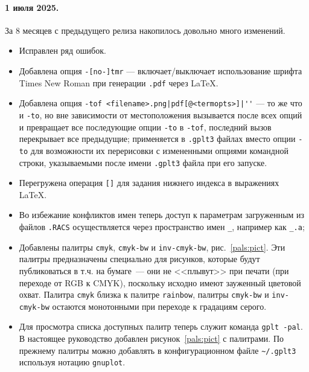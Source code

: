 \documentclass[12pt]{article}
\begin{document}
\paragraph{1 июля 2025.} За 8 месяцев с предыдущего релиза накопилось довольно много изменений.
\begin{itemize}
\item Исправлен ряд ошибок.
\item Добавлена опция \verb'-[no-]tmr' --- включает/выключает использование шрифта Times New Roman при генерации \verb'.pdf' через \LaTeX.
\item Добавлена опция \verb:-tof <filename>.png|pdf[@<termopts>]|'': --- то же что и \verb'-to', но вне зависимости 
  от местоположения вызывается после всех опций и превращает все последующие
   опции \verb'-to' в \verb'-tof', последний вызов перекрывает все предыдущие; применяется в
   \verb'.gplt3' файлах вместо опции \verb'-to' для возможности их перерисовки с измененными опциями командной строки, указываемыми после имени
   \verb'.gplt3' файла при его запуске.
\item Перегружена операция \verb'[]' для задания нижнего индекса в выражениях \LaTeX.
\item Во избежание конфликтов имен теперь доступ к  параметрам загруженным из файлов \verb'.RACS' осуществляется через пространство имен \verb'_',
  например как \verb'_.a';
\item Добавлены палитры \verb'cmyk', \verb'cmyk-bw' и \verb'inv-cmyk-bw', рис.~\ref{pals:pict}.
  Эти палитры предназначены специально для рисунков, которые будут публиковаться в т.ч.
  на бумаге~--- они не <<плывут>> при печати (при переходе от RGB к CMYK),
  поскольку исходно имеют зауженный цветовой охват. Палитра \verb'cmyk'  близка к палитре \verb'rainbow', палитры \verb'cmyk-bw' и \verb'inv-cmyk-bw'
  остаются монотонными при переходе к градациям серого.
\item Для просмотра списка доступных палитр теперь служит команда \verb'gplt -pal'. В настоящее руководство добавлен рисунок~\ref{pals:pict} с
  палитрами. По прежнему палитры можно добавлять в конфигурационном файле \verb'~/.gplt3' используя нотацию \verb'gnuplot'.
\end{itemize}
\end{document}
